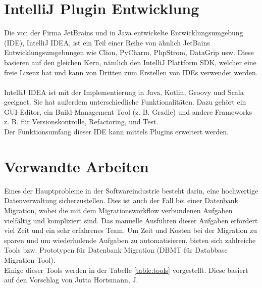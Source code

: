 \section{IntelliJ Plugin Entwicklung}
Die von der Firma JetBrains und in Java entwickelte Entwicklungsumgebung (IDE), IntelliJ IDEA, ist ein Teil einer Reihe von ähnlich JetBains Entwicklungsumgebungen wie Clion, PyCharm, PhpStrom, DataGrip usw. Diese basieren  auf den gleichen Kern, nämlich den IntelliJ Plattform SDK, welcher eine freie Lizenz hat und kann von Dritten zum Erstellen von IDEs verwendet werden.\\ \\
IntelliJ IDEA ist mit der Implementierung in Java, Kotlin, Groovy und Scala geeignet. Sie hat außerdem unterschiedliche Funktionalitäten. Dazu gehört ein GUI-Editor, ein Build-Management Tool (z. B. Gradle) und andere Frameworks z. B. für Versionskontrolle, Refactoring, und Test.\\
Der Funktionsumfang dieser IDE kann mittels Plugins erweitert werden. 

\section{Verwandte Arbeiten}
\label{verwandte}
Eines der Hauptprobleme in der Softwareindustrie besteht darin, eine hochwertige Datenverwaltung sicherzustellen. Dies ist auch der Fall bei einer Datenbank Migration, wobei die mit dem Migrationsworkflow verbundenen Aufgaben vielfältig und kompliziert sind. Das manuelle Ausführen dieser Aufgaben erfordert viel Zeit und ein sehr erfahrenes Team. Um Zeit und Kosten bei der Migration zu sparen und um wiederholende Aufgaben zu automatisieren, bieten sich zahlreiche Tools bzw. Prototypen für Datenbank Migration (DBMT für Databbase Migration Tool). \\
Einige dieser Tools werden in der Tabelle \ref{table:tools} vorgestellt. Diese basiert auf den Vorschlag von Jutta Hortsmann, J.

